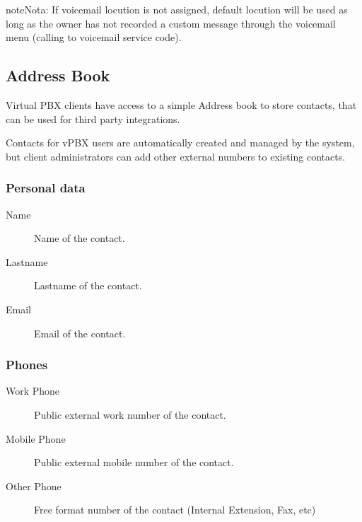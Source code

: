 \documentclass[letterpaper,10pt,spanish]{sphinxmanual}
\begin{document}
\begin{notice}{note}{Nota:}
If voicemail locution is not assigned, default locution will be used as long as
the owner has not recorded a custom message through the voicemail menu (calling to
voicemail service code).
\end{notice}


\subsection{Address Book}
\label{administration_portal/client/vpbx/addressbook:address-book}\label{administration_portal/client/vpbx/addressbook::doc}
Virtual PBX clients have access to a simple Address book to store contacts,
that can be used for third party integrations.

Contacts for vPBX users are automatically created and managed by the system,
but client administrators can add other external numbers to existing contacts.


\subsubsection{Personal data}
\label{administration_portal/client/vpbx/addressbook:personal-data}\begin{description}
\item[{Name}] \leavevmode{}\label{administration_portal/client/vpbx/addressbook:term-name}
Name of the contact.

\item[{Lastname}] \leavevmode{}\label{administration_portal/client/vpbx/addressbook:term-lastname}
Lastname of the contact.

\item[{Email}] \leavevmode{}\label{administration_portal/client/vpbx/addressbook:term-email}
Email of the contact.

\end{description}


\subsubsection{Phones}
\label{administration_portal/client/vpbx/addressbook:phones}\begin{description}
\item[{Work Phone}] \leavevmode{}\label{administration_portal/client/vpbx/addressbook:term-work-phone}
Public external work number of the contact.

\item[{Mobile Phone}] \leavevmode{}\label{administration_portal/client/vpbx/addressbook:term-mobile-phone}
Public external mobile number of the contact.

\item[{Other Phone}] \leavevmode{}\label{administration_portal/client/vpbx/addressbook:term-other-phone}
Free format number of the contact (Internal Extension, Fax, etc)

\end{description}
\end{document}
